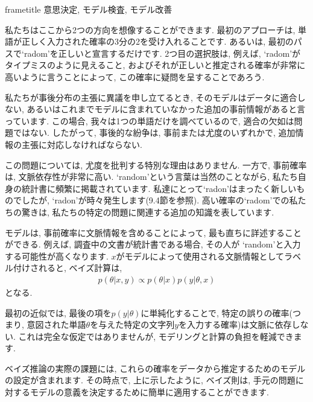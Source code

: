 \documentclass[10pt,dvipdfmx,a4]{beamer}
\newcommand{\eqn}[1]{\begin{align*}#1\end{align*}}
\newcommand{\dbox}[1]{\begin{beamercolorbox}[wd=122mm, sep=0pt, shadow=false, rounded=false]{frametitle} { #1}\end{beamercolorbox}}
\begin{document}
\begin{frame}
\dbox{意思決定, モデル検査, モデル改善}

私たちはここから2つの方向を想像することができます.
最初のアプローチは, 単語が正しく入力された確率の3分の2を受け入れることです.
あるいは, 最初のパスで`radom'を正しいと宣言するだけです.
2つ目の選択肢は, 例えば, `radom'がタイプミスのように見えること, およびそれが正しいと推定される確率が非常に高いように言うことによって, この確率に疑問を呈することであろう.

私たちが事後分布の主張に異議を申し立てるとき, そのモデルはデータに適合しない, あるいはこれまでモデルに含まれていなかった追加の事前情報があると言っています.
この場合, 我々は1つの単語だけを調べているので, 適合の欠如は問題ではない.
したがって, 事後的な紛争は, 事前または尤度のいずれかで, 追加情報の主張に対応しなければならない.

この問題については, 尤度を批判する特別な理由はありません.
一方で, 事前確率は, 文脈依存性が非常に高い.
`random'という言葉は当然のことながら, 私たち自身の統計書に頻繁に掲載されています.
私達にとって`radon'はまったく新しいものでしたが, `radon'が時々発生します(9.4節を参照).
高い確率の`radom'での私たちの驚きは, 私たちの特定の問題に関連する追加の知識を表しています.
\end{frame}


\begin{frame}
モデルは, 事前確率に文脈情報を含めることによって, 最も直ちに詳述することができる.
例えば, 調査中の文書が統計書である場合, その人が `random'と入力する可能性が高くなります.
$x$がモデルによって使用される文脈情報としてラベル付けされると, ベイズ計算は, 
\eqn{p(\theta|x,y)\propto p(\theta|x)p(y|\theta, x)}
となる.

最初の近似では, 最後の項を$p(y|\theta)$に単純化することで, 特定の誤りの確率(つまり, 意図された単語$\theta$を与えた特定の文字列$y$を入力する確率)は文脈に依存しない.
これは完全な仮定ではありませんが, モデリングと計算の負担を軽減できます.

ベイズ推論の実際の課題には, これらの確率をデータから推定するためのモデルの設定が含まれます.
その時点で, 上に示したように, ベイズ則は, 手元の問題に対するモデルの意義を決定するために簡単に適用することができます.
\end{frame}

\end{document}
